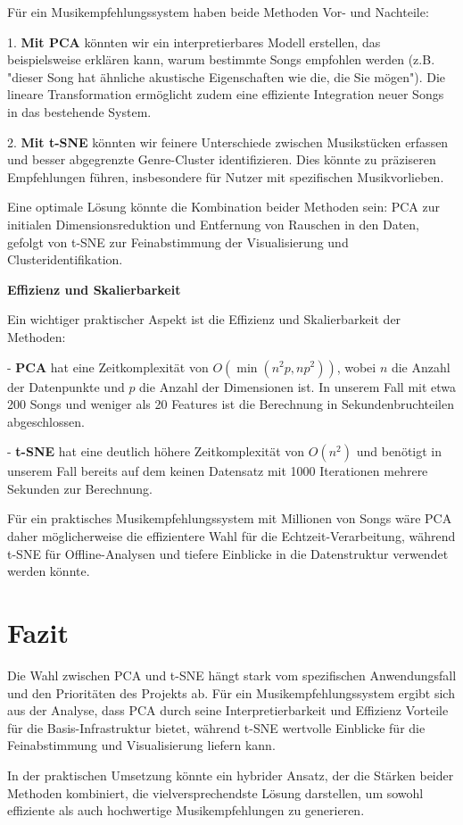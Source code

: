 Für ein Musikempfehlungssystem haben beide Methoden Vor- und Nachteile:

1. \textbf{Mit PCA} könnten wir ein interpretierbares Modell erstellen, das beispielsweise erklären kann, warum bestimmte Songs empfohlen werden (z.B. "dieser Song hat ähnliche akustische Eigenschaften wie die, die Sie mögen"). Die lineare Transformation ermöglicht zudem eine effiziente Integration neuer Songs in das bestehende System.

2. \textbf{Mit t-SNE} könnten wir feinere Unterschiede zwischen Musikstücken erfassen und besser abgegrenzte Genre-Cluster identifizieren. Dies könnte zu präziseren Empfehlungen führen, insbesondere für Nutzer mit spezifischen Musikvorlieben.

Eine optimale Lösung könnte die Kombination beider Methoden sein: PCA zur initialen Dimensionsreduktion und Entfernung von Rauschen in den Daten, gefolgt von t-SNE zur Feinabstimmung der Visualisierung und Clusteridentifikation.

\textbf{Effizienz und Skalierbarkeit}

Ein wichtiger praktischer Aspekt ist die Effizienz und Skalierbarkeit der Methoden:

- \textbf{PCA} hat eine Zeitkomplexität von \(O(\min(n^2p, np^2))\), wobei \(n\) die Anzahl der Datenpunkte und \(p\) die Anzahl der Dimensionen ist. In unserem Fall mit etwa 200 Songs und weniger als 20 Features ist die Berechnung in Sekundenbruchteilen abgeschlossen.

- \textbf{t-SNE} hat eine deutlich höhere Zeitkomplexität von \(O(n^2)\) und benötigt in unserem Fall bereits auf dem keinen Datensatz mit 1000 Iterationen mehrere Sekunden zur Berechnung.

Für ein praktisches Musikempfehlungssystem mit Millionen von Songs wäre PCA daher möglicherweise die effizientere Wahl für die Echtzeit-Verarbeitung, während t-SNE für Offline-Analysen und tiefere Einblicke in die Datenstruktur verwendet werden könnte.

\section{Fazit}

Die Wahl zwischen PCA und t-SNE hängt stark vom spezifischen Anwendungsfall und den Prioritäten des Projekts ab. Für ein Musikempfehlungssystem ergibt sich aus der Analyse, dass PCA durch seine Interpretierbarkeit und Effizienz Vorteile für die Basis-Infrastruktur bietet, während t-SNE wertvolle Einblicke für die Feinabstimmung und Visualisierung liefern kann.

In der praktischen Umsetzung könnte ein hybrider Ansatz, der die Stärken beider Methoden kombiniert, die vielversprechendste Lösung darstellen, um sowohl effiziente als auch hochwertige Musikempfehlungen zu generieren.
